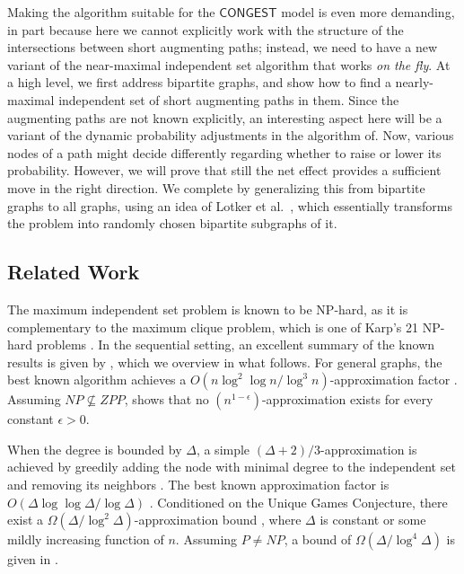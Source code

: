 \documentclass[11pt]{article}
\begin{document}
Making the algorithm suitable for the $\mathsf{CONGEST}$ model is even more demanding, in part because here we cannot explicitly work with the structure of the intersections between short augmenting paths; instead, we need to have a new variant of the near-maximal independent set algorithm that works \emph{on the fly}. At a high level, we first address bipartite graphs, and show how to find a nearly-maximal independent set of short augmenting paths in them. Since the augmenting paths are not known explicitly, an interesting aspect here will be a variant of the dynamic probability adjustments in the algorithm of\cite{Ghaffari2016}. Now, various nodes of a path might decide differently regarding whether to raise or lower its probability. However, we will prove that still the net effect provides a sufficient move in the right direction. We complete by generalizing this from bipartite graphs to all graphs, using an idea of Lotker et al.~\cite{lotkerMatchingImproved}, which essentially transforms the problem into randomly chosen bipartite subgraphs of it.


\subsection{Related Work} 
The maximum independent set problem is known to be NP-hard, as it is complementary to the maximum clique problem, which is one of Karp's 21 NP-hard problems \cite{Karp72}.
In the sequential setting, an excellent summary of the known results is given by \cite{bansal2015approximating}, which we overview in what follows. For general graphs, the best known algorithm achieves a $O(n\log^2 \log n/ \log^3 n)$-approximation factor \cite{feige2004approximating}. Assuming $NP \nsubseteq ZPP$, \cite{haastad1996clique} shows that no $(n^{1-\epsilon})$-approximation exists for every constant $\epsilon > 0$.

When the degree is bounded by $\Delta$, a simple $(\Delta+2)/3$-approximation is achieved by greedily adding the node with minimal degree to the independent set and removing its neighbors \cite{halldorsson1997greed}. The best known approximation factor is $O(\Delta \log \log \Delta / \log \Delta)$ \cite{alon1998approximating, halldorsson1998approximations, halperin2002improved, halldorsson2000approximations, karger1998approximate}.
Conditioned on the Unique Games Conjecture, there exist a $\Omega(\Delta / \log^2 \Delta)$-approximation bound \cite{austrin2009inapproximability}, where $\Delta$ is constant or some mildly increasing function of $n$. Assuming $P\neq NP$, a bound of $\Omega(\Delta / \log ^4 \Delta)$ is given in \cite{chan2013approximation}.
\end{document}
